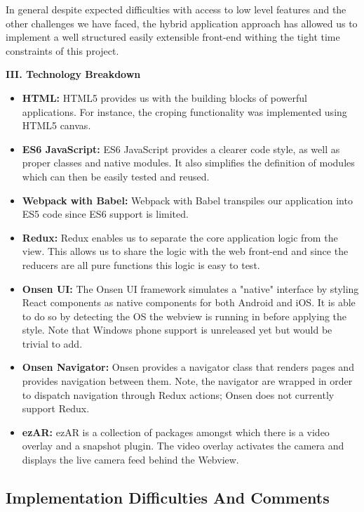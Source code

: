 In general despite expected difficulties with access to low level features and the other challenges we have faced, the hybrid application approach has allowed us to implement a well structured easily extensible front-end withing the tight time constraints of this project.

\textbf{III. Technology Breakdown}
\begin{itemize}
  \item \textbf{HTML:} HTML5 provides us with the building blocks of powerful  applications. For instance, the croping functionality was implemented using HTML5 canvas.
  \item \textbf{ES6 JavaScript:} ES6 JavaScript provides a clearer code style, as well as proper classes and native modules. It also simplifies the definition of modules which can then be easily tested and reused.
  \item \textbf{Webpack with Babel:} Webpack with Babel transpiles our application into ES5 code since ES6 support is limited.
  \item \textbf{Redux:} Redux enables us to separate the core application logic from the view. This allows us to share the logic with the web front-end and since the reducers are all pure functions this logic is easy to test.
  \item \textbf{Onsen UI:} The Onsen UI framework simulates a "native" interface by styling React components as native components for both Android and iOS. It is able to do so by detecting the OS the webview is running in before applying the style. Note that Windows phone support is unreleased yet but would be trivial to add.
  \item \textbf{Onsen Navigator:} Onsen provides a navigator class that renders pages and provides navigation between them. Note, the navigator are wrapped in order to dispatch navigation through Redux actions; Onsen does not currently support Redux.
  \item \textbf{ezAR:} ezAR is a collection of packages amongst which there is a video overlay and a snapshot plugin. The video overlay activates the camera and displays the live camera feed behind the Webview.
\end{itemize}

\subsection{Implementation Difficulties And Comments}


